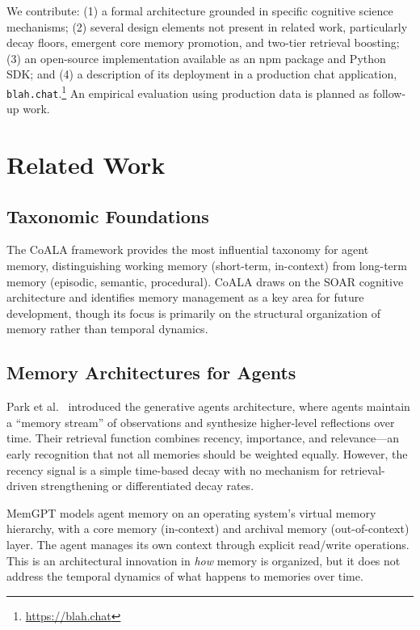 \documentclass[11pt,a4paper]{article}
\begin{document}
We contribute: (1) a formal architecture grounded in specific cognitive science mechanisms; (2) several design elements not present in related work, particularly decay floors, emergent core memory promotion, and two-tier retrieval boosting; (3) an open-source implementation available as an npm package and Python SDK; and (4) a description of its deployment in a production chat application, \texttt{blah.chat}.\footnote{\url{https://blah.chat}} An empirical evaluation using production data is planned as follow-up work.

\section{Related Work}

\subsection{Taxonomic Foundations}

The CoALA framework \citep{sumers2024coala} provides the most influential taxonomy for agent memory, distinguishing working memory (short-term, in-context) from long-term memory (episodic, semantic, procedural). CoALA draws on the SOAR cognitive architecture and identifies memory management as a key area for future development, though its focus is primarily on the structural organization of memory rather than temporal dynamics.

\subsection{Memory Architectures for Agents}

Park et al.~\citeyearpar{park2023generative} introduced the generative agents architecture, where agents maintain a ``memory stream'' of observations and synthesize higher-level reflections over time. Their retrieval function combines recency, importance, and relevance---an early recognition that not all memories should be weighted equally. However, the recency signal is a simple time-based decay with no mechanism for retrieval-driven strengthening or differentiated decay rates.

MemGPT \citep{packer2023memgpt} models agent memory on an operating system's virtual memory hierarchy, with a core memory (in-context) and archival memory (out-of-context) layer. The agent manages its own context through explicit read/write operations. This is an architectural innovation in \emph{how} memory is organized, but it does not address the temporal dynamics of what happens to memories over time.
\end{document}
